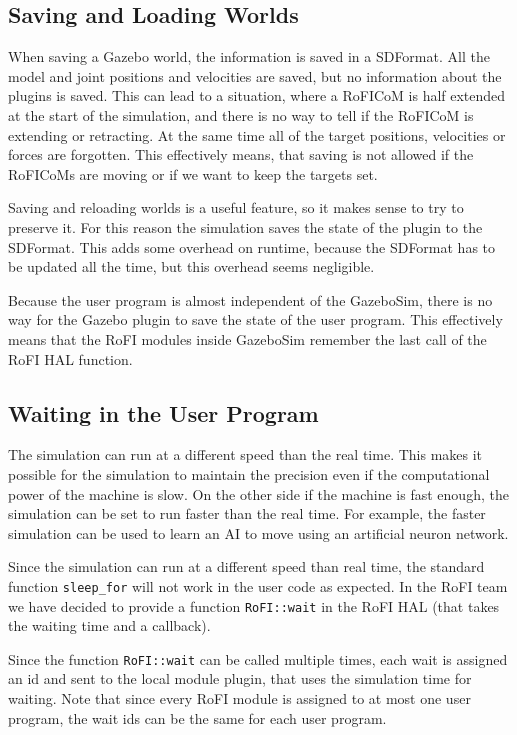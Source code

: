 \documentclass[
  digital, %
  table,   %
  oneside, %
  nolof,     %
  nolot,     %
]{fithesis3}
\newcommand{\code}[1]{\texttt{#1}}
\begin{document}
\subsection{Saving and Loading Worlds}

When saving a Gazebo world, the information is saved in a SDFormat.
All the model and joint positions and velocities are saved, but no information about the plugins is saved.
This can lead to a situation, where a RoFICoM is half extended at the start of the simulation, and there is no way to tell if the RoFICoM is extending or retracting.
At the same time all of the target positions, velocities or forces are forgotten.
This effectively means, that saving is not allowed if the RoFICoMs are moving or if we want to keep the targets set.

Saving and reloading worlds is a useful feature, so it makes sense to try to preserve it.
For this reason the simulation saves the state of the plugin to the SDFormat.
This adds some overhead on runtime, because the SDFormat has to be updated all the time, but this overhead seems negligible.

Because the user program is almost independent of the GazeboSim, there is no way for the Gazebo plugin to save the state of the user program.
This effectively means that the RoFI modules inside GazeboSim remember the last call of the RoFI HAL function.

\subsection{Waiting in the User Program}

The simulation can run at a different speed than the real time.
This makes it possible for the simulation to maintain the precision even if the computational power of the machine is slow.
On the other side if the machine is fast enough, the simulation can be set to run faster than the real time.
For example, the faster simulation can be used to learn an AI to move using an artificial neuron network.

Since the simulation can run at a different speed than real time, the standard function \code{sleep\_for} will not work in the user code as expected.
In the RoFI team we have decided to provide a function \code{RoFI::wait} in the RoFI HAL (that takes the waiting time and a callback).

Since the function \code{RoFI::wait} can be called multiple times, each wait is assigned an id and sent to the local module plugin, that uses the simulation time for waiting.
Note that since every RoFI module is assigned to at most one user program, the wait ids can be the same for each user program.
\end{document}

